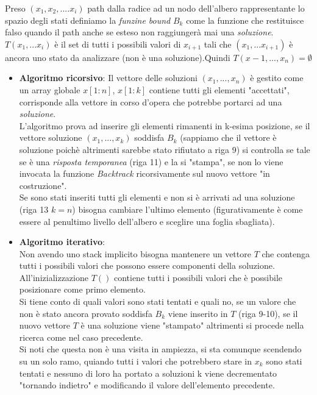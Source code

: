\documentclass[a4paper]{article}
\begin{document}
Preso $(x_1,x_2,....x_i)$ path dalla radice ad un nodo dell'albero rappresentante lo spazio degli stati definiamo la \textit{funzine bound} $B_k$ come la funzione che restituisce falso quando il path anche se esteso non raggiungerà mai una \textit{soluzione}.\\
$T(x_1,...x_i)$ è il set di tutti i possibili valori di $x_{i+1}$ tali che $(x_1,...x_{i+1})$ è ancora uno stato da analizzare (non è una soluzione).Quindi $T(x-1,...,x_n) = \emptyset$
\begin{itemize}
	\item \textbf{Algoritmo ricorsivo}:
		Il vettore delle soluzioni $(x_1, ... , x_n)$ è gestito come un array globale $x[1:n]$, $x[1:k]$ contiene tutti gli elementi "accettati", corrisponde alla vettore in corso d'opera che potrebbe portarci ad una \textit{soluzione}.\\
		L'algoritmo prova ad inserire gli elementi rimanenti in k-esima posizione, se il vettore soluzione $(x_1,...,x_k)$ soddisfa $B_k$ (sappiamo che il vettore è soluzione poichè altrimenti sarebbe stato rifiutato a riga 9) si controlla se tale se è una \textit{risposta temporanea} (riga 11) e la si "stampa", se non lo viene invocata la funzione \textit{Backtrack} ricorsivamente sul nuovo vettore "in costruzione".\\
		Se sono stati inseriti tutti gli elementi e non si è arrivati ad una soluzione (riga 13 $k=n$) bisogna cambiare l'ultimo elemento (figurativamente è come essere al penultimo livello dell'albero e sceglire una foglia sbagliata).
	\item \textbf{Algoritmo iterativo}:\\
		Non avendo uno stack implicito bisogna mantenere un vettore $T$ che contenga tutti i possibili valori che possono essere componenti della soluzione.
		All'inizializzazione $T()$ contiene tutti i possibili valori che è possibile posizionare come primo elemento.\\
		Si tiene conto di quali valori sono stati tentati e quali no, se un valore che non è stato ancora provato soddisfa $B_k$ viene inserito in $T$ (riga 9-10), se il nuovo vettore $T$ è una soluzione viene "stampato" altrimenti si procede nella ricerca come nel caso precedente.\\
		Si noti che questa non è una visita in ampiezza, si sta comunque scendendo su un solo ramo, quiando tutti i valori che potrebbero stare in $x_k$ sono stati tentati e nessuno di loro ha portato a soluzioni k viene decrementato "tornando indietro" e modificando il valore dell'elemento precedente.
\end{itemize}
\end{document}

